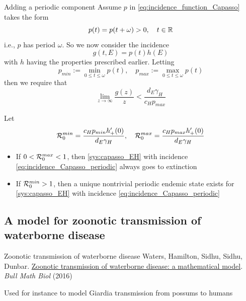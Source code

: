 \documentclass[aspectratio=169]{beamer}
\begin{document}
\begin{frame}{Adding a periodic component}
  Assume $p$ in \eqref{eq:incidence_function_Capasso} takes the form 
  \begin{equation}
    p(t)=p(t+\omega)>0,\quad t\in\mathbb{R}
  \end{equation}
  i.e., $p$ has period $\omega$. So we now consider the incidence
  \begin{equation}
    \label{eq:incidence_Capasso_periodic}
    g(t,E)=p(t)h(E)
  \end{equation}
  with $h$ having the properties prescribed earlier.
  Letting 
  \begin{equation}
    p_{min} := \min_{0\leq t\leq\omega}p(t),\quad
    p_{max} := \max_{0\leq t\leq\omega}p(t)
  \end{equation}
  then we require that 
  \begin{equation}
    \lim_{z\to\infty}\frac{g(z)}{z}<\frac{d_E\gamma_H}{c_Hp_{max}}
  \end{equation}
\end{frame}


\begin{frame}
  Let
  \begin{equation}
    \label{eq:R0_capasso_periodic}
    \mathcal{R}_0^{min} = \frac{c_Hp_{min}h'_+(0)}{d_E\gamma_H},\quad 
    \mathcal{R}_0^{max} = \frac{c_Hp_{max}h'_+(0)}{d_E\gamma_H}
  \end{equation}
  \begin{theorem}
    \begin{itemize}
      \item If $0<\mathcal{R}_0^{max}<1$, then \eqref{sys:capasso_EH} with incidence \eqref{eq:incidence_Capasso_periodic} always goes to extinction
      \item If $\mathcal{R}_0^{min}>1$, then a unique nontrivial periodic endemic state exists for \eqref{sys:capasso_EH} with incidence \eqref{eq:incidence_Capasso_periodic}
    \end{itemize}
  \end{theorem}
\end{frame}



\subsection{A model for zoonotic transmission of waterborne disease}

\begin{frame}{Zoonotic transmission of waterborne disease}
  Waters, Hamilton, Sidhu, Sidhu, Dunbar. \href{https://doi-org.uml.idm.oclc.org/10.1007/s11538-015-0136-y}{Zoonotic transmission of waterborne disease: a mathematical model}. 
  \emph{Bull Math Biol}  (2016)

  Used for instance to model Giardia transmission from possums to humans
\end{frame}
\end{document}
